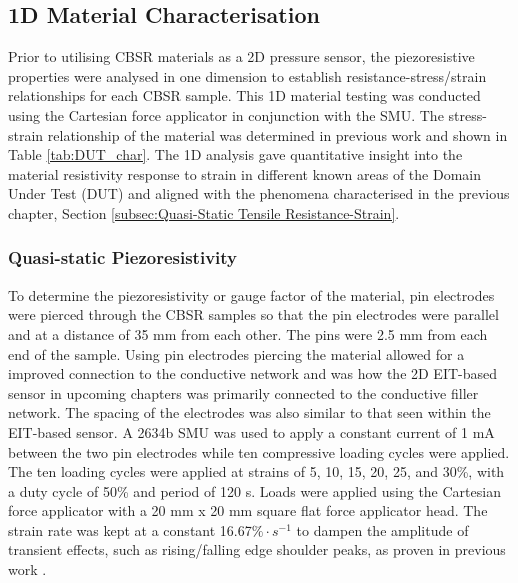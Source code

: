 

\subsection{1D Material Characterisation} \label{sec:1D Material Characterisation}
Prior to utilising CBSR materials as a 2D pressure sensor, the piezoresistive properties were analysed in one dimension to establish resistance-stress/strain relationships for each CBSR sample. This 1D material testing was conducted using the Cartesian force applicator in conjunction with the SMU. The stress-strain relationship of the material was determined in previous work and shown in Table \ref{tab:DUT_char}. The 1D analysis gave quantitative insight into the material resistivity response to strain in different known areas of the Domain Under Test (DUT) and aligned with the phenomena characterised in the previous chapter, Section \ref{subsec:Quasi-Static Tensile Resistance-Strain}.

\subsubsection{Quasi-static Piezoresistivity}\label{sec:Quasi-static Piezoresistivity}
To determine the piezoresistivity or gauge factor of the material, pin electrodes were pierced through the CBSR samples so that the pin electrodes were parallel and at a distance of 35 mm from each other. The pins were 2.5 mm from each end of the sample. Using pin electrodes piercing the material allowed for a improved connection to the conductive network and was how the 2D EIT-based sensor in upcoming chapters was primarily connected to the conductive filler network. The spacing of the electrodes was also similar to that seen within the EIT-based sensor. A 2634b SMU was used to apply a constant current of 1 mA between the two pin electrodes while ten compressive loading cycles were applied. The ten loading cycles were applied at strains of 5, 10, 15, 20, 25, and 30\%, with a duty cycle of 50\% and period of 120 s. Loads were applied using the Cartesian force applicator with a 20 mm x 20 mm square flat force applicator head. The strain rate was kept at a constant 16.67$\% \cdot s^{-1}$ to dampen the amplitude of transient effects, such as rising/falling edge shoulder peaks, as proven in previous work \citep{Ellingham2021}.

